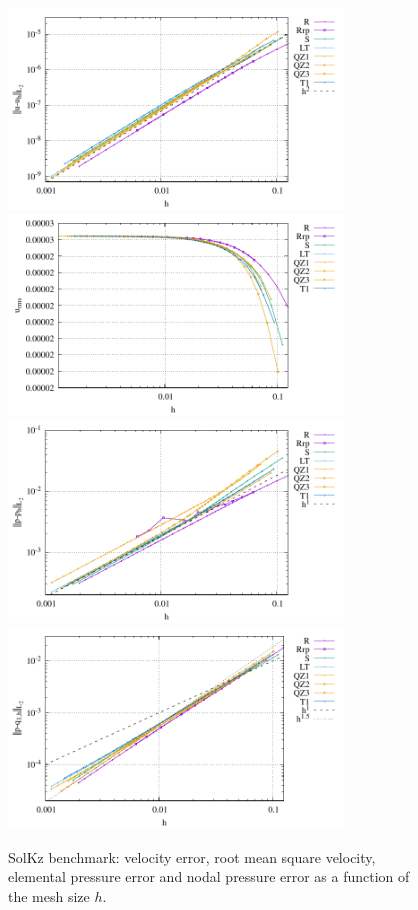 \documentclass[a4paper,12pt]{article}
\begin{document}
\begin{figure}
\centering
\includegraphics[width=8.9cm]{../results/errors_u_exp5}
\includegraphics[width=8.9cm]{../results/vrms_exp5} \\
\includegraphics[width=8.9cm]{../results/errors_p_exp5}
\includegraphics[width=8.9cm]{../results/errors_q1_exp5}
\caption{SolKz benchmark: velocity error, 
root mean square velocity, elemental pressure error and nodal pressure error
as a function of the mesh size $h$.} 
\label{fig:ressolkz}
\end{figure}
\end{document}
